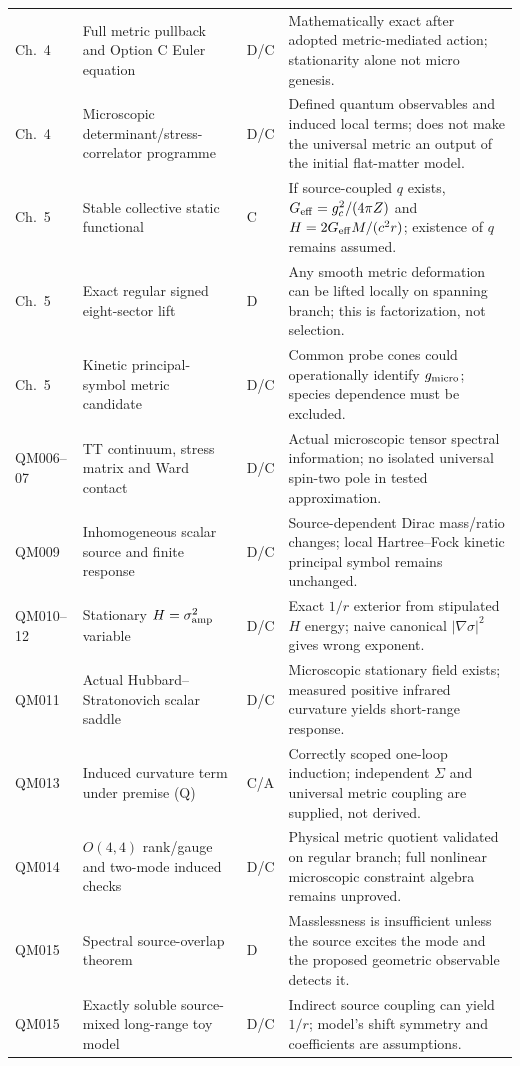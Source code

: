 \documentclass[11pt,a4paper]{article}
\begin{document}
{\begin{longtable}{@{}p{.07\linewidth}p{.29\linewidth}p{.09\linewidth}p{.46\linewidth}@{}}
Ch.~4 & Full metric pullback and Option C Euler equation & D/C & Mathematically exact after adopted metric-mediated action; stationarity alone not micro genesis.\\
Ch.~4 & Microscopic determinant/stress-correlator programme & D/C & Defined quantum observables and induced local terms; does not make the universal metric an output of the initial flat-matter model.\\
Ch.~5 & Stable collective static functional & C & If source-coupled $q$ exists, $G_{\rm eff}=g_c^2/(4\pi Z)$ and $H=2G_{\rm eff}M/(c^2r)$; existence of $q$ remains assumed.\\
Ch.~5 & Exact regular signed eight-sector lift & D & Any smooth metric deformation can be lifted locally on spanning branch; this is factorization, not selection.\\
Ch.~5 & Kinetic principal-symbol metric candidate & D/C & Common probe cones could operationally identify $g_{\rm micro}$; species dependence must be excluded.\\
QM006--07 & TT continuum, stress matrix and Ward contact & D/C & Actual microscopic tensor spectral information; no isolated universal spin-two pole in tested approximation.\\
QM009 & Inhomogeneous scalar source and finite response & D/C & Source-dependent Dirac mass/ratio changes; local Hartree--Fock kinetic principal symbol remains unchanged.\\
QM010--12 & Stationary $H=\sigma_{\rm amp}^2$ variable & D/C & Exact $1/r$ exterior from stipulated $H$ energy; naive canonical $|\nabla\sigma|^2$ gives wrong exponent.\\
QM011 & Actual Hubbard--Stratonovich scalar saddle & D/C & Microscopic stationary field exists; measured positive infrared curvature yields short-range response.\\
QM013 & Induced curvature term under premise (Q) & C/A & Correctly scoped one-loop induction; independent $\Sigma$ and universal metric coupling are supplied, not derived.\\
QM014 & $O(4,4)$ rank/gauge and two-mode induced checks & D/C & Physical metric quotient validated on regular branch; full nonlinear microscopic constraint algebra remains unproved.\\
QM015 & Spectral source-overlap theorem & D & Masslessness is insufficient unless the source excites the mode and the proposed geometric observable detects it.\\
QM015 & Exactly soluble source-mixed long-range toy model & D/C & Indirect source coupling can yield $1/r$; model's shift symmetry and coefficients are assumptions.\\

\end{longtable}}
\end{document}

